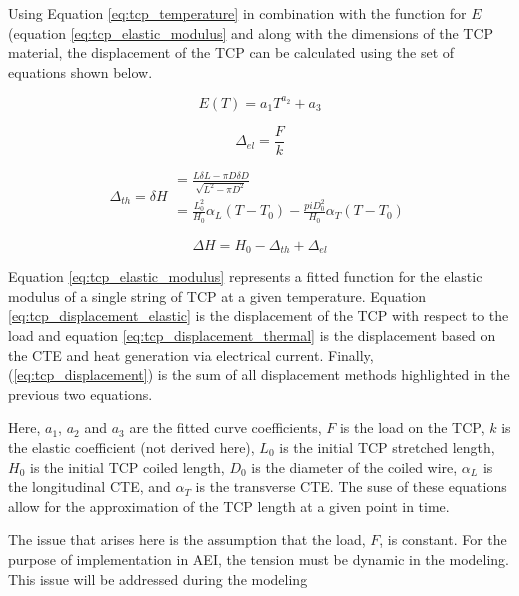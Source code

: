 		Using Equation \ref{eq:tcp_temperature} in combination with the function for $E$ (equation \ref{eq:tcp_elastic_modulus} and along with the dimensions of the TCP material, the displacement of the TCP can be calculated using the set of equations shown below.
	
		\begin{equation}
		\label{eq:tcp_elastic_modulus}
			E(T) = a_{1} T^{a_{2}} + a_{3}
		\end{equation}
	
		\begin{equation}
		\label{eq:tcp_displacement_elastic}
			\Delta_{el} = \frac{F}{k}
		\end{equation}
		
		\begin{equation}
		\label{eq:tcp_displacement_thermal}
			\Delta_{th} = \delta H
			\begin{matrix}			
				= \frac{L \delta L - \pi D \delta D}{\sqrt{L^{2} - \pi D^{2}}} \\
				= \frac{L^{2}_{0}}{H_{0}} \alpha_{L} (T - T_{0}) - \frac{pi D^{2}_{0}}{H_{0}} \alpha_{T} (T - T_{0})
			\end{matrix}
		\end{equation}
		
		\begin{equation}
		\label{eq:tcp_displacement}
			\Delta H = H_{0} - \Delta_{th} + \Delta_{el}
		\end{equation}
		
		Equation \ref{eq:tcp_elastic_modulus} represents a fitted function for the elastic modulus of a single string of TCP at a given temperature. Equation \ref{eq:tcp_displacement_elastic} is the displacement of the TCP with respect to the load and equation \ref{eq:tcp_displacement_thermal} is the displacement based on the CTE and heat generation via electrical current. Finally, (\ref{eq:tcp_displacement}) is the sum of all displacement methods highlighted in the previous two equations.
	
		Here, $a_{1}$, $a_{2}$ and $a_{3}$ are the fitted curve coefficients, $F$ is the load on the TCP, $k$ is the elastic coefficient (not derived here), $L_{0}$ is the initial TCP stretched length, $H_{0}$ is the initial TCP coiled length, $D_{0}$ is the diameter of the coiled wire, $\alpha_{L}$ is the longitudinal CTE, and $\alpha_{T}$ is the transverse CTE. The suse of these equations allow for the approximation of the TCP length at a given point in time.
	
		The issue that arises here is the assumption that the load, $F$, is constant. For the purpose of implementation in AEI, the tension must be dynamic in the modeling. This issue will be addressed during the modeling 

